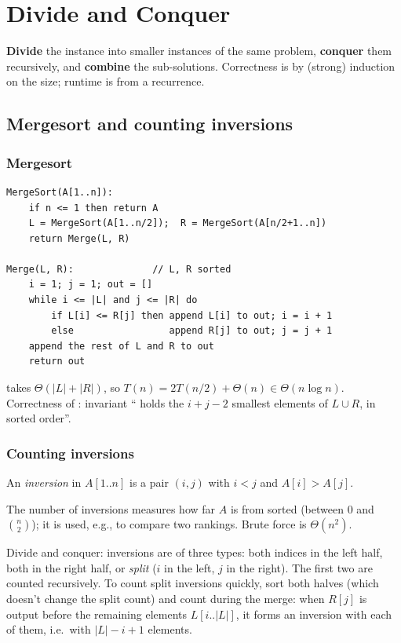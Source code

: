 \chapter{Divide and Conquer}

\begin{important}[Paradigm]
\textbf{Divide} the instance into smaller instances of the same problem,
\textbf{conquer} them recursively, and \textbf{combine} the sub-solutions.
Correctness is by (strong) induction on the size; runtime is from a recurrence.
\end{important}

\section{Mergesort and counting inversions}

\subsection{Mergesort}
\begin{lstlisting}[style=pseudo]
MergeSort(A[1..n]):
    if n <= 1 then return A
    L = MergeSort(A[1..n/2]);  R = MergeSort(A[n/2+1..n])
    return Merge(L, R)

Merge(L, R):              // L, R sorted
    i = 1; j = 1; out = []
    while i <= |L| and j <= |R| do
        if L[i] <= R[j] then append L[i] to out; i = i + 1
        else                 append R[j] to out; j = j + 1
    append the rest of L and R to out
    return out
\end{lstlisting}
 takes $\Theta(|L|+|R|)$, so $T(n)=2T(n/2)+\Theta(n)\in\Theta(n\log n)$.
Correctness of : invariant `` holds the $i+j-2$ smallest elements of $L\cup R$, in sorted order''.

\subsection{Counting inversions}
\begin{definition}
An \emph{inversion} in $A[1..n]$ is a pair $(i,j)$ with $i<j$ and $A[i]>A[j]$.
\end{definition}
The number of inversions measures how far $A$ is from sorted (between $0$ and $\binom n2$);
it is used, e.g., to compare two rankings. Brute force is $\Theta(n^2)$.

Divide and conquer: inversions are of three types: both indices in the left half,
both in the right half, or \emph{split} ($i$ in the left, $j$ in the right).
The first two are counted recursively. To count split inversions quickly, sort both halves
(which doesn't change the split count) and count during the merge:
when $R[j]$ is output before the remaining elements $L[i..|L|]$, it forms an inversion with
each of them, i.e.\ with $|L|-i+1$ elements.

